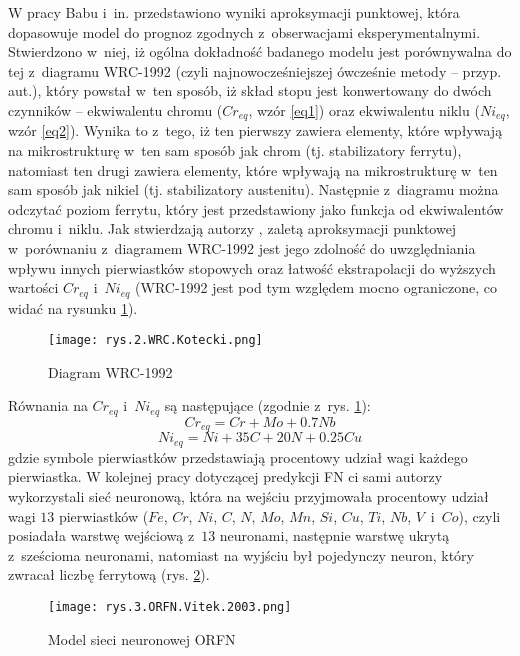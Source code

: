 W pracy Babu i~in. \cite{Babu13} przedstawiono wyniki aproksymacji punktowej, która dopasowuje model do prognoz zgodnych z~obserwacjami eksperymentalnymi. Stwierdzono w~niej, iż ogólna dokładność badanego modelu jest porównywalna do tej z~diagramu WRC-1992 (czyli najnowocześniejszej ówcześnie metody – przyp. aut.), który powstał w~ten sposób, iż skład stopu jest konwertowany do dwóch czynników – ekwiwalentu chromu ($Cr_{eq}$, wzór \ref{eq1}) oraz ekwiwalentu niklu ($Ni_{eq}$, wzór \ref{eq2}). Wynika to z~tego, iż ten pierwszy zawiera elementy, które wpływają na mikrostrukturę w~ten sam sposób jak chrom (tj. stabilizatory ferrytu), natomiast ten drugi zawiera elementy, które wpływają na mikrostrukturę w~ten sam sposób jak nikiel (tj. stabilizatory austenitu). Następnie z~diagramu można odczytać poziom ferrytu, który jest przedstawiony jako funkcja od ekwiwalentów chromu i~niklu. Jak stwierdzają autorzy \cite{Babu13}, zaletą aproksymacji punktowej w~porównaniu z~diagramem WRC-1992 jest jego zdolność do uwzględniania wpływu innych pierwiastków stopowych oraz łatwość ekstrapolacji do wyższych wartości $Cr_{eq}$ i~$Ni_{eq}$ (WRC-1992 jest pod tym względem mocno ograniczone, co widać na rysunku \ref{fig:mesh2}).
\begin{figure}[h]
    \centering
    \texttt{[image: rys.2.WRC.Kotecki.png]}
    \caption{Diagram WRC-1992 \cite{Kotecki92}}
    \label{fig:mesh2}
\end{figure}

\noindent Równania na  $Cr_{eq}$ i~$Ni_{eq}$ są następujące (zgodnie z~rys. \ref{fig:mesh2}):
\begin{equation}
\label{eq1}
	Cr_{eq} = Cr + Mo + 0.7Nb
\end{equation}
\begin{equation}
\label{eq2}
	Ni_{eq} = Ni+35C+20N+0.25Cu
\end{equation}
gdzie symbole pierwiastków przedstawiają procentowy udział wagi każdego pierwiastka.
W kolejnej pracy \cite{Vitek03.I} dotyczącej predykcji FN ci sami autorzy wykorzystali sieć neuronową, która na wejściu przyjmowała procentowy udział wagi $13$ pierwiastków ($Fe$, $Cr$, $Ni$, $C$, $N$, $Mo$, $Mn$, $Si$, $Cu$, $Ti$, $Nb$, $V$~i~$Co$), czyli posiadała warstwę wejściową z~$13$ neuronami, następnie warstwę ukrytą z~sześcioma neuronami, natomiast na wyjściu był pojedynczy neuron, który zwracał liczbę ferrytową (rys. \ref{fig:mesh3}).

\begin{figure}[h]
    \centering
    \texttt{[image: rys.3.ORFN.Vitek.2003.png]}
    \caption{Model sieci neuronowej ORFN \cite{Vitek03.I, Vitek03.II}}
    \label{fig:mesh3}
\end{figure}

